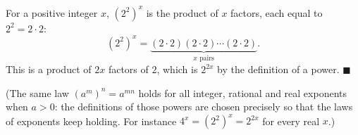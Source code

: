 For a positive integer $x$, $\left(2^2\right)^x$ is the product of $x$ factors, each equal to $2^2=2\cdot2$:
\[
\left(2^2\right)^x=\underbrace{(2\cdot2)(2\cdot2)\cdots(2\cdot2)}_{x\text{ pairs}} .
\]
This is a product of $2x$ factors of $2$, which is $2^{2x}$ by the definition of a power. $\blacksquare$

(The same law $\left(a^m\right)^n=a^{mn}$ holds for all integer, rational and real exponents when $a>0$: the definitions of those powers are chosen precisely so that the laws of exponents keep holding. For instance $4^x=\left(2^2\right)^x=2^{2x}$ for every real $x$.)
